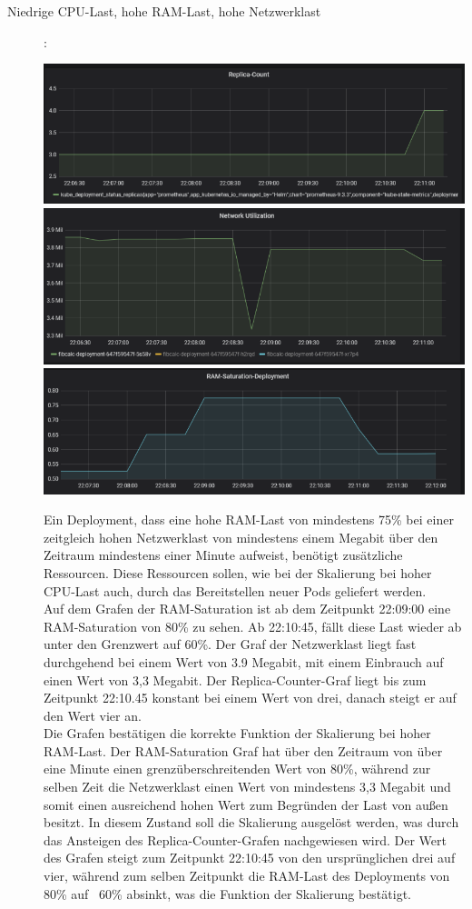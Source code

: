 \documentclass[a4paper,10pt]{scrartcl}
\begin{document}
\begin{description}
\pagebreak

\item[Niedrige CPU-Last, hohe RAM-Last, hohe Netzwerklast]:\\
\begin{minipage}{\linewidth}
            \includegraphics[width=.5\textwidth]{img/RAMSkalierung/Replica-Count.PNG}
            \includegraphics[scale=1,width=.5\textwidth,height=.14\textheight]{img/RAMSkalierung/Netzwerk.PNG}
  			\includegraphics[scale=1,width=.5\textwidth]{img/RAMSkalierung/RAMSaturation.PNG}

\end{minipage}

Ein Deployment, dass eine hohe RAM-Last von mindestens 75\% bei einer zeitgleich hohen Netzwerklast von mindestens einem Megabit über den Zeitraum mindestens einer Minute aufweist, benötigt zusätzliche Ressourcen. Diese Ressourcen sollen, wie bei der Skalierung bei hoher CPU-Last auch, durch das Bereitstellen neuer Pods geliefert werden.\\
Auf dem Grafen der RAM-Saturation ist ab dem Zeitpunkt 22:09:00 eine RAM-Saturation von 80\% zu sehen. Ab 22:10:45, fällt diese Last wieder ab unter den Grenzwert auf 60\%. Der Graf der Netzwerklast liegt fast durchgehend bei einem Wert von 3.9 Megabit, mit einem Einbrauch auf einen Wert von 3,3 Megabit. Der \glqq Replica-Counter\grqq -Graf liegt bis zum Zeitpunkt 22:10.45 konstant bei einem Wert von drei, danach steigt er auf den Wert vier an.\\
Die Grafen bestätigen die korrekte Funktion der Skalierung bei hoher RAM-Last. 
Der RAM-Saturation Graf hat über den Zeitraum von über eine Minute einen grenzüberschreitenden Wert von 80\%, während zur selben Zeit die Netzwerklast einen Wert von mindestens 3,3 Megabit und somit einen ausreichend hohen Wert zum Begründen der Last von außen besitzt. In diesem Zustand soll die Skalierung ausgelöst werden, was durch das Ansteigen des \glqq Replica-Counter\grqq -Grafen nachgewiesen wird. Der Wert des Grafen steigt zum Zeitpunkt 22:10:45 von den ursprünglichen drei auf vier, während zum selben Zeitpunkt die RAM-Last des Deployments von 80\% auf ~60\% absinkt, was die Funktion der Skalierung bestätigt.



\end{description}
\end{document}
